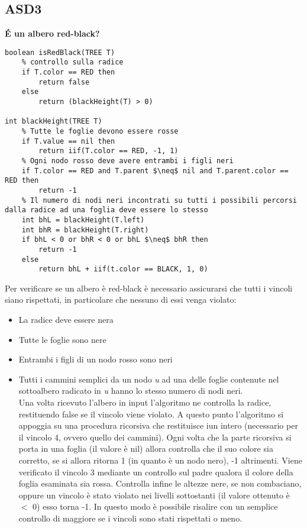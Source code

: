 \documentclass[../cheatSheetAlgoritmi.tex]{subfiles}
\begin{document}
\subsection{ASD3}
\textbf{É un albero red-black?}\\
\begin{lstlisting}[caption=É un albero red-black?]
boolean isRedBlack(TREE T)
	% controllo sulla radice
  	if T.color == RED then
    	return false
  	else
    	return (blackHeight(T) > 0)

int blackHeight(TREE T)
  	% Tutte le foglie devono essere rosse
  	if T.value == nil then
    	return iif(T.color == RED, -1, 1)
  	% Ogni nodo rosso deve avere entrambi i figli neri
  	if T.color == RED and T.parent $\neq$ nil and T.parent.color == RED then
    	return -1
  	% Il numero di nodi neri incontrati su tutti i possibili percorsi dalla radice ad una foglia deve essere lo stesso
  	int bhL = blackHeight(T.left)
  	int bhR = blackHeight(T.right)
  	if bhL < 0 or bhR < 0 or bhL $\neq$ bhR then
    	return -1
  	else
    	return bhL + iif(t.color == BLACK, 1, 0)
\end{lstlisting}
Per verificare se un albero è red-black è necessario assicurarsi che tutti i vincoli siano rispettati, in particolare che nessuno di essi venga violato:
\begin{itemize}
 	\item La radice deve essere nera
 	\item Tutte le foglie sono nere
 	\item Entrambi i figli di un nodo rosso sono neri
 	\item Tutti i cammini semplici da un nodo \textit{u} ad una delle foglie contenute nel sottoalbero radicato in \textit{u} hanno lo stesso numero di nodi neri.\\ Una volta ricevuto l'albero in input l'algoritmo ne controlla la radice, restituendo false se il vincolo viene violato. A questo punto l'algoritmo si appoggia su una procedura ricorsiva che restituisce iun intero (necessario per il vincolo 4, ovvero quello dei cammini).
Ogni volta che la parte ricorsiva si porta in una foglia (il valore è nil) allora controlla che il suo colore sia corretto, se si allora ritorna 1 (in quanto è un nodo nero), -1 altrimenti. Viene verificato il vincolo 3 mediante un controllo sul padre qualora il colore della foglia esaminata sia rossa. Controlla infine le altezze nere, se non combaciano, oppure un vincolo è stato violato nei livelli sottostanti (il valore ottenuto è $<$ 0) esso torna -1. In questo modo è possibile risalire con un semplice controllo di maggiore se i vincoli sono stati rispettati o meno.
\end{itemize}\
\end{document}
